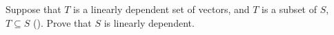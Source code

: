 Suppose that $T$ is a linearly dependent set of vectors, and $T$ is a subset of $S$, $T\subseteq S$ ().  Prove that $S$ is linearly dependent.